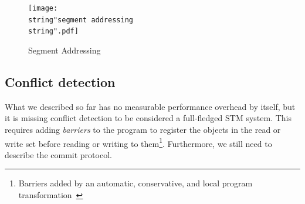 \documentclass{sigplanconf}
\begin{document}

\begin{figure}[t]
  \centering
  \texttt{[image: \\string"segment addressing\\string".pdf]}
  \caption{Segment Addressing\label{fig:Segment-Addressing}}
\end{figure}


\subsection{Conflict detection}

What we described so far has no measurable performance overhead by
itself, but it is missing conflict detection to be considered a
full-fledged STM system.  This requires adding \emph{barriers} to the
program to register the objects in the read or write set before
reading or writing to them\footnote{Barriers added by an automatic, conservative, and
local program transformation~\cite{felber07}}.  Furthermore, we still
need to describe the commit protocol.
\end{document}
